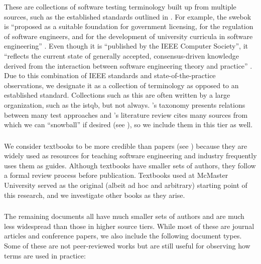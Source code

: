 These are collections of software testing terminology built up from multiple
sources, such as the established standards outlined in . For
example, the \acs{swebok} is ``proposed as a
suitable foundation for government licensing, for the regulation of software
engineers, and for the development of university curricula in software
engineering'' \citep[p.~xix]{KanerEtAl2011}. Even though it is ``published by
the IEEE Computer Society'', it ``reflects the current state of generally
accepted, consensus-driven knowledge derived from the interaction between
software engineering theory and practice'' \citep{AboutSWEBOK}. Due to this
combination of IEEE standards and state-of-the-practice observations, we
designate it as a collection of terminology as opposed to an established
standard. Collections such as this are often written by a large
organization, such as the \acf{istqb}, but not always. \ifnotpaper \else
    \citeauthor{Firesmith2015} \fi \citet{Firesmith2015}'s taxonomy presents
relations between many test approaches and \ifnotpaper \else
    \citeauthor{DoğanEtAl2014} \fi \citet{DoğanEtAl2014}'s literature
review cites many sources from which we can ``snowball'' if desired
(see ), so we include them in this tier as well.

\subsubsection{}\label{texts}

We consider textbooks to be more credible than papers (see )
because they are widely used as resources for teaching software engineering and
industry frequently uses them as guides. Although textbooks have smaller sets of
authors, they follow a formal review process before publication. Textbooks used
at McMaster University \citep{Patton2006,PetersAndPedrycz2000,vanVliet2000}
served as the original (albeit ad hoc and arbitrary) starting point of this
research, and we investigate other books as they arise. \addTextEx{}

\subsubsection{}\label{papers}

The remaining documents all have much smaller sets of authors and are much less
widespread than those in higher source tiers. While most of these are journal
articles and conference papers, we also include the following document types.
Some of these are not peer-reviewed works but are still useful for
observing how terms are used in practice:

